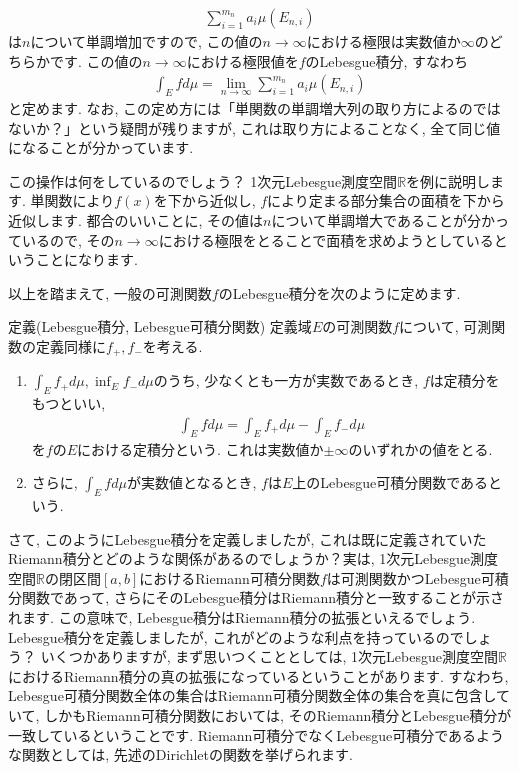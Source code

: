 \begin{eqnarray}
\sum_{i=1}^{m_{n}}a_{i}\mu\left(E_{n,i}\right) \nonumber
\end{eqnarray}
は$n$について単調増加ですので, この値の$n \to \infty$における極限は実数値か$\infty$のどちらかです. この値の$n \to \infty$における極限値を$f$のLebesgue積分, すなわち
\begin{eqnarray}
\int_{E}fd\mu = \lim_{n \to \infty} \sum_{i=1}^{m_{n}}a_{i}\mu\left(E_{n,i}\right) \nonumber
\end{eqnarray}
と定めます. なお, この定め方には「単関数の単調増大列の取り方によるのではないか？」という疑問が残りますが, これは取り方によることなく, 全て同じ値になることが分かっています. 
\par この操作は何をしているのでしょう？ 1次元Lebesgue測度空間$\mathbb{R}$を例に説明します. 単関数により$f(x)$を下から近似し, $f$により定まる部分集合の面積を下から近似します. 都合のいいことに, その値は$n$について単調増大であることが分かっているので, その$n \to \infty$における極限をとることで面積を求めようとしているということになります. 
\par 以上を踏まえて, 一般の可測関数$f$のLebesgue積分を次のように定めます. 
\begin{itembox}[l]{定義(Lebesgue積分, Lebesgue可積分関数)}
定義域$E$の可測関数$f$について, 可測関数の定義同様に$f_{+}, f_{-}$を考える. 
\begin{enumerate}
\item $\int_{E}f_{+}d\mu, \inf_{E}f_{-}d\mu$のうち, 少なくとも一方が実数であるとき, $f$は定積分をもつといい,
\begin{eqnarray}
\int_{E}fd\mu=\int_{E}f_{+}d\mu - \int_{E}f_{-}d\mu \nonumber
\end{eqnarray}
を$f$の$E$における定積分という. これは実数値か$\pm \infty$のいずれかの値をとる. 
\item さらに, $\displaystyle \int_{E}fd\mu$が実数値となるとき, $f$は$E$上のLebesgue可積分関数であるという. 
\end{enumerate}
\end{itembox}
\par さて, このようにLebesgue積分を定義しましたが, これは既に定義されていたRiemann積分とどのような関係があるのでしょうか？実は, 1次元Lebesgue測度空間$\mathbb{R}$の閉区間$[a,b]$におけるRiemann可積分関数$f$は可測関数かつLebesgue可積分関数であって, さらにそのLebesgue積分はRiemann積分と一致することが示されます. この意味で, Lebesgue積分はRiemann積分の拡張といえるでしょう. 
Lebesgue積分を定義しましたが, これがどのような利点を持っているのでしょう？ いくつかありますが, まず思いつくこととしては, 1次元Lebesgue測度空間$\mathbb{R}$におけるRiemann積分の真の拡張になっているということがあります. すなわち, Lebesgue可積分関数全体の集合はRiemann可積分関数全体の集合を真に包含していて, しかもRiemann可積分関数においては, そのRiemann積分とLebesgue積分が一致しているということです. Riemann可積分でなくLebesgue可積分であるような関数としては, 先述のDirichletの関数を挙げられます. 
